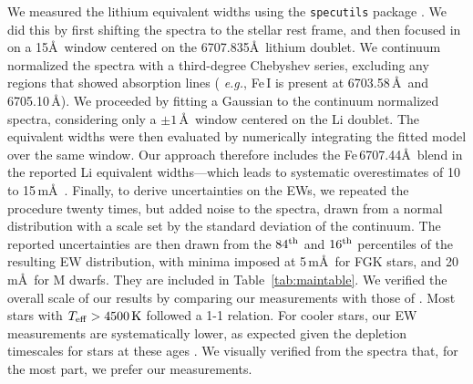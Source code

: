 \documentclass[12pt,twocolumn,tighten]{aastex63}
\begin{document}
%
%

We measured the lithium equivalent widths using the \texttt{specutils}
package \citep{specutils_v1pt1}.  We did this by first shifting the
spectra to the stellar rest frame, and then focused in on a 15\AA\
window centered on the 6707.835\AA\ lithium doublet.  We 
continuum normalized the spectra with a third-degree Chebyshev
series, excluding any regions that showed absorption lines ({\it
e.g.}, Fe\,\textsc{I} is present at 6703.58\,\AA\ and 6705.10\,\AA).
We proceeded by fitting a Gaussian to the continuum normalized
spectra, considering only a $\pm 1\,$\AA\ window centered on the Li
doublet.  The equivalent widths were then evaluated by numerically
integrating the fitted model over the same window.  Our approach
therefore includes the Fe\,6707.44\AA\ blend in the reported Li equivalent
widths---which leads to systematic overestimates of 10 to
15\,m\AA\ \citep[{\it e.g.},][]{bouvier_pleiades_lirot_2018}.
Finally, to derive uncertainties on the EWs, we repeated the procedure
twenty times, but added noise to the spectra, drawn from a normal
distribution with a scale set by the standard deviation of the
continuum.  The reported uncertainties are then drawn from the
$84^{\rm th}$ and $16^{\rm th}$ percentiles of the resulting EW
distribution, with minima imposed at 5\,m\AA\ for FGK stars, and
20\,m\AA\ for M dwarfs. They are included in
Table~\ref{tab:maintable}.  We verified the overall scale of our
results by comparing our measurements with those of
\citet{randich_gaiaeso_2018}.  Most stars with $T_{\rm eff} >
4500\,{\rm K}$ followed a 1-1 relation.  For cooler stars, our EW
measurements are systematically lower, as expected given the depletion
timescales for stars at these ages \citep[{\it
e.g.},][]{soderblom_ages_2014}.  We visually verified from the spectra
that, for the most part, we prefer our measurements.


\end{document}
